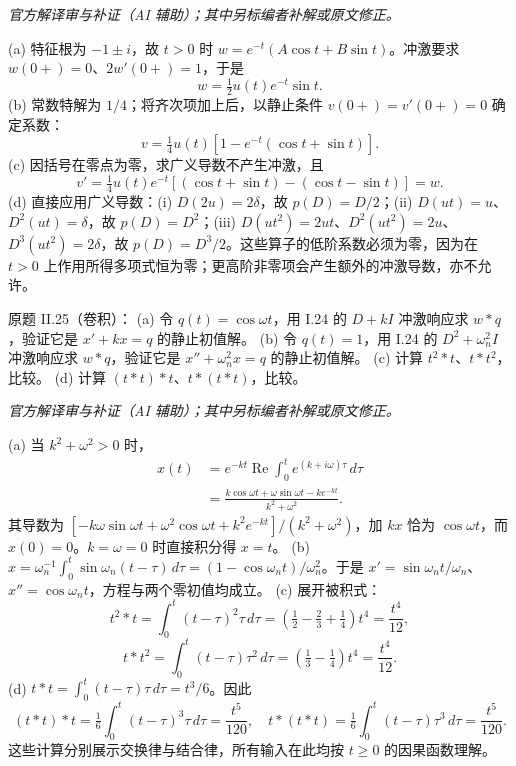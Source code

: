 \begin{solution}
\textit{官方解译审与补证（AI 辅助）；其中另标编者补解或原文修正。}\par

(a) 特征根为 $-1\pm i$，故 $t>0$ 时 $w=e^{-t}(A\cos t+B\sin t)$。冲激要求 $w(0+)=0$、$2w'(0+)=1$，于是
\[w=\tfrac12u(t)e^{-t}\sin t.\]
(b) 常数特解为 $1/4$；将齐次项加上后，以静止条件 $v(0+)=v'(0+)=0$ 确定系数：
\[v=\tfrac14u(t)[1-e^{-t}(\cos t+\sin t)].\]
(c) 因括号在零点为零，求广义导数不产生冲激，且
\[v'=\tfrac14u(t)e^{-t}[(\cos t+\sin t)-(\cos t-\sin t)]=w.\]
(d) 直接应用广义导数：(i) $D(2u)=2\delta$，故 $p(D)=D/2$；(ii) $D(ut)=u$、$D^2(ut)=\delta$，故 $p(D)=D^2$；(iii) $D(ut^2)=2ut$、$D^2(ut^2)=2u$、$D^3(ut^2)=2\delta$，故 $p(D)=D^3/2$。这些算子的低阶系数必须为零，因为在 $t>0$ 上作用所得多项式恒为零；更高阶非零项会产生额外的冲激导数，亦不允许。
\end{solution}
\begin{exercise}\label{cw:ps6-II-25}原题 II.25（卷积）：
(a) 令 $q(t)=\cos\omega t$，用 I.24 的 $D+kI$ 冲激响应求 $w*q$，验证它是 $x'+kx=q$ 的静止初值解。
(b) 令 $q(t)=1$，用 I.24 的 $D^2+\omega_n^2I$ 冲激响应求 $w*q$，验证它是 $x''+\omega_n^2x=q$ 的静止初值解。
(c) 计算 $t^2*t$、$t*t^2$，比较。
(d) 计算 $(t*t)*t$、$t*(t*t)$，比较。\end{exercise}
\begin{solution}
\textit{官方解译审与补证（AI 辅助）；其中另标编者补解或原文修正。}\par

(a) 当 $k^2+\omega^2>0$ 时，
\begin{align*}
x(t)&=e^{-kt}\operatorname{Re}\int_0^t e^{(k+i\omega)\tau}\,d\tau\\
&=\frac{k\cos\omega t+\omega\sin\omega t-ke^{-kt}}{k^2+\omega^2}.
\end{align*}
其导数为 $[-k\omega\sin\omega t+\omega^2\cos\omega t+k^2e^{-kt}]/(k^2+\omega^2)$，加 $kx$ 恰为 $\cos\omega t$，而 $x(0)=0$。$k=\omega=0$ 时直接积分得 $x=t$。
(b) $x=\omega_n^{-1}\int_0^t\sin\omega_n(t-\tau)\,d\tau=(1-\cos\omega_nt)/\omega_n^2$。于是 $x'=\sin\omega_nt/\omega_n$、$x''=\cos\omega_nt$，方程与两个零初值均成立。
(c) 展开被积式：
\[t^2*t=\int_0^t(t-\tau)^2\tau\,d\tau=(\tfrac12-\tfrac23+\tfrac14)t^4=\frac{t^4}{12},\]
\[t*t^2=\int_0^t(t-\tau)\tau^2\,d\tau=(\tfrac13-\tfrac14)t^4=\frac{t^4}{12}.\]
(d) $t*t=\int_0^t(t-\tau)\tau\,d\tau=t^3/6$。因此
\[(t*t)*t=\tfrac16\int_0^t(t-\tau)^3\tau\,d\tau=\frac{t^5}{120},\quad t*(t*t)=\tfrac16\int_0^t(t-\tau)\tau^3\,d\tau=\frac{t^5}{120}.\]
这些计算分别展示交换律与结合律，所有输入在此均按 $t\ge0$ 的因果函数理解。
\end{solution}
